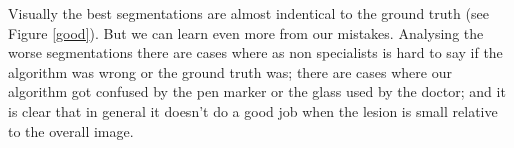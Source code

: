\documentclass{article}
\begin{document}
Visually the best segmentations are almost indentical to the ground truth (see Figure \ref{good}). But we can learn even more from our mistakes. Analysing the worse segmentations there are cases where as non specialists is hard to say if the algorithm was wrong or the ground truth was; there are cases where our algorithm got confused by the pen marker or the glass used by the doctor; and it is clear that in general it doesn't do a good job when the lesion is small relative to the overall image. 




\medskip

\small


\end{document}
